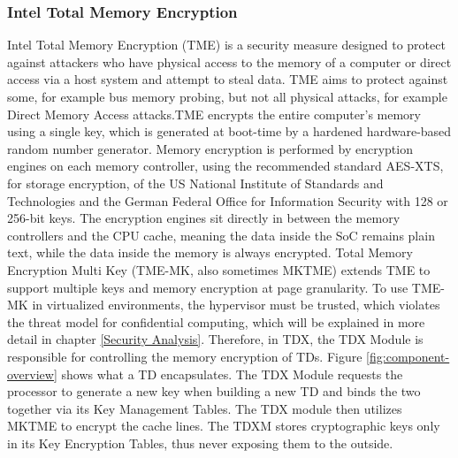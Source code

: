 \subsubsection{Intel Total Memory Encryption}
\label{Memory Encrpytion}
Intel Total Memory Encryption (TME) is a security measure designed to protect against attackers who have physical access to the memory of a computer or direct access via a host system and attempt to steal data. TME aims to protect against some, for example bus memory probing, but not all physical attacks, for example Direct Memory Access attacks.TME encrypts the entire computer's memory using a single key, which is generated at boot-time by a hardened hardware-based random number generator. Memory encryption is performed by encryption engines on each memory controller, using the recommended standard AES-XTS, for storage encryption, of the US National Institute of Standards and Technologies \cite{morris_dworkin_recommendation_2015} and the German Federal Office for Information Security with 128 or 256-bit keys\cite[~p. 24]{bundesamt_fur_sicherheit_in_der_informationstechnik_cryptographic_2023}. The encryption engines sit directly in between the memory controllers and the CPU cache, meaning the data inside the SoC remains plain text, while the data inside the memory is always encrypted. Total Memory Encryption Multi Key (TME-MK, also sometimes MKTME) extends TME to support multiple keys and memory encryption at page granularity. To use TME-MK in virtualized environments, the hypervisor must be trusted, which violates the threat model for confidential computing, which will be explained in more detail in chapter \ref{Security Analysis}. Therefore, in TDX, the TDX Module is responsible for controlling the memory encryption of TDs. Figure \ref{fig:component-overview} shows what a TD encapsulates. The TDX Module requests the processor to generate a new key when building a new TD and binds the two together via its Key Management Tables. The TDX module then utilizes MKTME to encrypt the cache lines. The TDXM stores cryptographic keys only in its Key Encryption Tables, thus never exposing them to the outside\cite{cheng_intel_2023}. 

